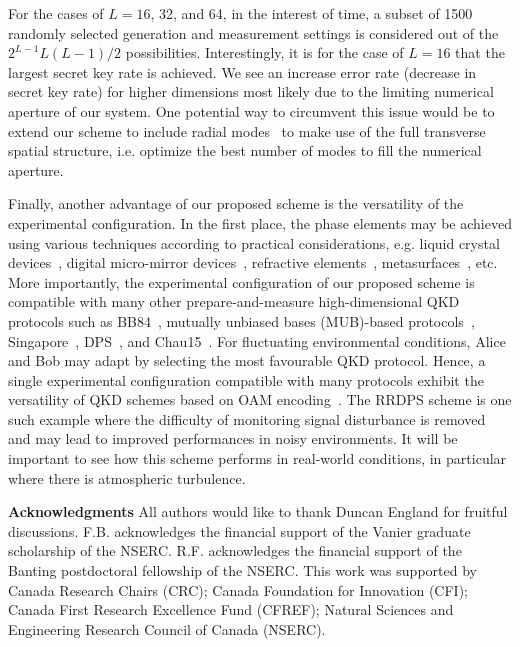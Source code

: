 \documentclass[twocolumn,aps,prl,floatfix,superscriptaddress]{revtex4-1}
\begin{document}
For the cases of $L=16$, 32, and 64, in the interest of time, a subset of 1500 randomly selected generation and measurement settings is considered out of the $2^{L-1}L(L-1)/2$ possibilities. Interestingly, it is for the case of $L=16$ that the largest secret key rate is achieved. We see an increase error rate (decrease in secret key rate) for higher dimensions most likely due to the limiting numerical aperture of our system. One potential way to circumvent this issue would be to extend our scheme to include radial modes~\cite{karimi:14b,karimi:14c} to make use of the full transverse spatial structure, i.e. optimize the best number of modes to fill the numerical aperture.

%
%

Finally, another advantage of our proposed scheme is the versatility of the experimental configuration. In the first place, the phase elements may be achieved using various techniques according to practical considerations, e.g. liquid crystal devices~\cite{marrucci:06,heckenberg:92}, digital micro-mirror devices~\cite{mirhosseini:13b}, refractive elements~\cite{beijersbergen:94}, metasurfaces~\cite{yu:11,karimi:14,bouchard:14}, etc. More importantly, the experimental configuration of our proposed scheme is compatible with many other prepare-and-measure high-dimensional QKD protocols such as BB84~\cite{bennett:84}, mutually unbiased bases (MUB)-based protocols~\cite{durt:10,mafu:13}, Singapore~\cite{englert:04b}, DPS~\cite{inoue:02}, and Chau15~\cite{chau:15,chau:17}. For fluctuating environmental conditions, Alice and Bob may adapt by selecting the most favourable QKD protocol. Hence, a single experimental configuration compatible with many protocols exhibit the versatility of QKD schemes based on OAM encoding~\cite{bouchard:18b}. The RRDPS scheme is one such example where the difficulty of monitoring signal disturbance is removed and may lead to improved performances in noisy environments. It will be important to see how this scheme performs in real-world conditions, in particular where there is atmospheric turbulence. 


\vspace{0.5 EM}

\noindent\textbf{Acknowledgments} All authors would like to thank Duncan England for fruitful discussions. F.B. acknowledges the financial support of the Vanier graduate scholarship of the NSERC. R.F. acknowledges the financial support of the Banting postdoctoral fellowship of the NSERC. This work was supported by Canada Research Chairs (CRC); Canada Foundation for Innovation (CFI); Canada First Research Excellence Fund (CFREF); Natural Sciences and Engineering Research Council of Canada (NSERC).
\end{document}
